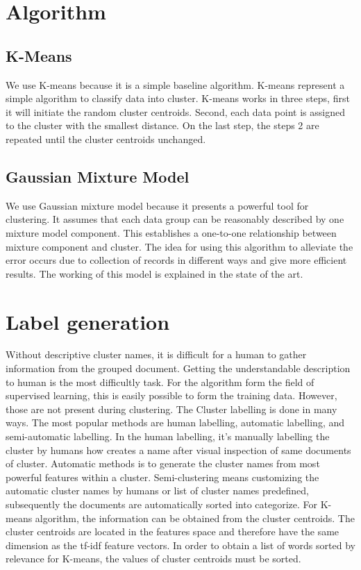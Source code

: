 \documentclass[a4paper,12pt]{report}
\begin{document}
    \section{Algorithm}
    \subsection{K-Means}
    We use K-means because it is a simple baseline algorithm. K-means represent a simple algorithm to classify data into cluster. K-means works in three steps, first it will initiate the random cluster centroids. Second, each data point is assigned to the cluster with the smallest distance. On the last step, the steps 2 are repeated until the cluster centroids unchanged.

    \subsection{Gaussian Mixture Model}
    We use Gaussian mixture model because it presents a powerful tool for clustering. It assumes that each data group can be reasonably described by one mixture model component. This establishes a one-to-one relationship between mixture component and cluster. The idea for using this algorithm to alleviate the error occurs due to collection of records in different ways and give more efficient results. The working of this model is explained in the state of the art.

    \section{Label generation}
    Without descriptive cluster names, it is difficult for a human to gather information from the grouped document. Getting the understandable description to human is the most difficultly task. For the algorithm form the field of supervised learning, this is easily possible to form the training data. However, those are not present during clustering. The Cluster labelling is done in many ways. The most popular methods are human labelling, automatic labelling, and semi-automatic labelling. In the human labelling, it's manually labelling the cluster by humans how creates a name after visual inspection of same documents of cluster. Automatic methods is to generate the cluster names from most powerful features within a cluster. Semi-clustering means customizing the automatic cluster names by humans or list of cluster names predefined, subsequently the documents are automatically sorted into categorize. For K-means algorithm, the information can be obtained from the cluster centroids. The cluster centroids are located in the features space and therefore have the same dimension as the tf-idf feature vectors. In order to obtain a list of words sorted by relevance for K-means, the values of cluster centroids must be sorted.
    
\end{document}
